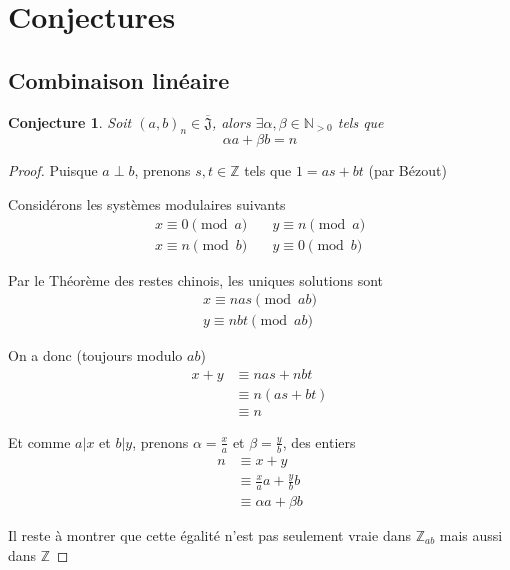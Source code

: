 \documentclass{article}
\newtheorem{conjecture}{Conjecture}
\newcommand{\J}{\mathfrak{J}}
\newcommand{\JS}{\overline{\J}}
\begin{document}
\newpage

\section{Conjectures}

\subsection{Combinaison linéaire}

\begin{conjecture}
    Soit ${(a, b)}_n \in \JS$, alors $\exists \alpha, \beta \in \mathbb{N}_{>0}$ tels que
    \[ \alpha a + \beta b = n \]
\end{conjecture}

\begin{proof}
    Puisque $a \perp b$, prenons $s, t \in \mathbb{Z}$ tels que $1 = as + bt$ (par Bézout)

    Considérons les systèmes modulaires suivants
    \begin{align*}
        x \equiv 0 \pmod a &\quad y \equiv n \pmod a \\
        x \equiv n \pmod b &\quad y \equiv 0 \pmod b
    \end{align*}

    Par le Théorème des restes chinois, les uniques solutions sont
    \begin{align*}
        x \equiv nas \pmod {ab} \\
        y \equiv nbt \pmod {ab}
    \end{align*}

    On a donc (toujours modulo $ab$)
    \begin{align*}
        x + y & \equiv nas + nbt \\
                & \equiv n(as + bt) \\
                & \equiv n
    \end{align*}

    Et comme $a \vert x$ et $b \vert y$, prenons $\alpha = \frac{x}{a}$ et $\beta = \frac{y}{b}$, des entiers
    \begin{align*}
        n & \equiv x + y \\
            & \equiv \frac{x}{a}a + \frac{y}{b}b \\
            & \equiv \alpha a + \beta b
    \end{align*}

    Il reste à montrer que cette égalité n'est pas seulement vraie dans $\mathbb{Z}_{ab}$ mais aussi dans $\mathbb{Z}$
\end{proof}
\end{document}
